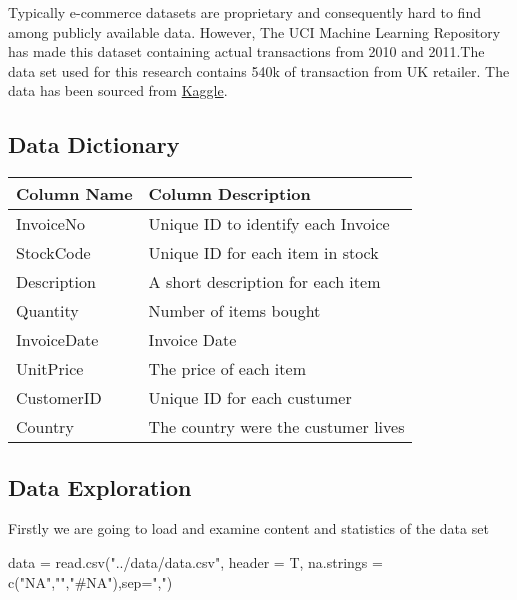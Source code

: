 Typically e-commerce datasets are proprietary and consequently hard to
find among publicly available data. However, The UCI Machine Learning
Repository has made this dataset containing actual transactions from
2010 and 2011.The data set used for this research contains 540k of
transaction from UK retailer. The data has been sourced from
\href{https://www.kaggle.com/carrie1/ecommerce-data}{Kaggle}.

\hypertarget{data-dictionary}{%
\subsection{Data Dictionary}\label{data-dictionary}}

\begin{longtable}[]{@{}ll@{}}
\toprule
Column Name & Column Description\tabularnewline
\midrule
\endhead
InvoiceNo & Unique ID to identify each Invoice\tabularnewline
StockCode & Unique ID for each item in stock\tabularnewline
Description & A short description for each item\tabularnewline
Quantity & Number of items bought\tabularnewline
InvoiceDate & Invoice Date\tabularnewline
UnitPrice & The price of each item\tabularnewline
CustomerID & Unique ID for each custumer\tabularnewline
Country & The country were the custumer lives\tabularnewline
\bottomrule
\end{longtable}

\hypertarget{data-exploration}{%
\subsection{Data Exploration}\label{data-exploration}}

Firstly we are going to load and examine content and statistics of the
data set

\begin{Schunk}
\begin{Sinput}
data = read.csv("../data/data.csv", header = T, 
                na.strings = c("NA","","#NA"),sep=",")
\end{Sinput}
\end{Schunk}

